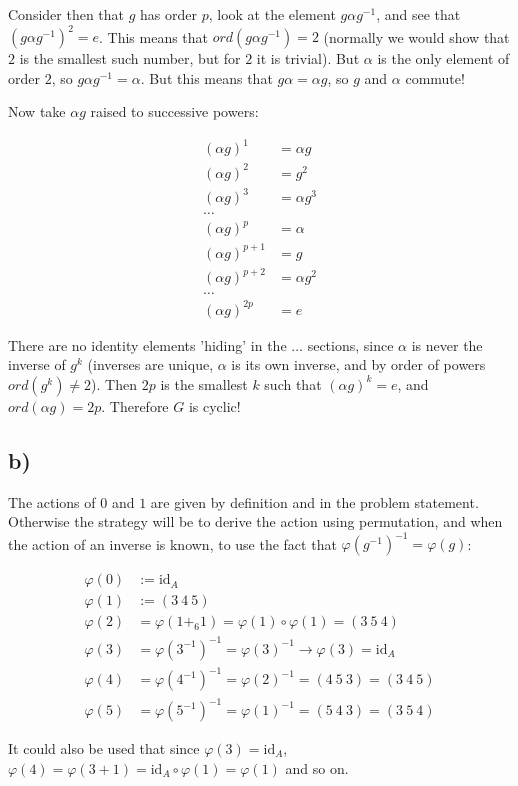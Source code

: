 \documentclass[a4paper,12pt]{article}
\begin{document}
Consider then that $g$ has order $p$, look at the element $g \alpha g^{-1}$, and see that $(g \alpha g^{-1})^2 = e$. This means that $ord(g \alpha g^{-1}) = 2$ (normally we would show that $2$ is the smallest such number, but for $2$ it is trivial). But $\alpha$ is the only element of order $2$, so $g \alpha g^{-1} = \alpha$. But this means that $g \alpha = \alpha g$, so $g$ and $\alpha$ commute!

Now take $\alpha g$ raised to successive powers:

\begin{align*}
    (\alpha g)^1 &= \alpha g \\
    (\alpha g)^2 &= g^2 \\
    (\alpha g)^3 &= \alpha g^3 \\
    \dots \\
    (\alpha g)^p &= \alpha \\
    (\alpha g)^{p + 1} &= g \\
    (\alpha g)^{p + 2} &= \alpha g^2 \\
    \dots \\
    (\alpha g)^{2p} &= e
\end{align*}

There are no identity elements 'hiding' in the $\dots$ sections, since $\alpha$ is never the inverse of $g^k$ (inverses are unique, $\alpha$ is its own inverse, and by order of powers $ord(g^k) \neq 2$). Then $2p$ is the smallest $k$ such that $(\alpha g)^k = e$, and $ord(\alpha g) = 2p$. Therefore $G$ is cyclic!

\newpage
\subsection*{b)}

The actions of $0$ and $1$ are given by definition and in the problem statement. Otherwise the strategy will be to derive the action using permutation, and when the action of an inverse is known, to use the fact that $\varphi(g^{-1})^{-1} = \varphi(g)$:

\begin{align*}
\varphi(0) &:= \mathrm{id}_A \\
\varphi(1) &:= (3\ 4\ 5) \\
\varphi(2) &= \varphi(1+_6 1) = \varphi(1) \circ \varphi(1) = (3\ 5\ 4) \\
\varphi(3) &= \varphi(3^{-1})^{-1} = \varphi(3)^{-1} \rightarrow \varphi(3) = \mathrm{id}_A \\
\varphi(4) &= \varphi(4^{-1})^{-1} = \varphi(2)^{-1} = (4\ 5\ 3) = (3\ 4\ 5) \\
\varphi(5) &= \varphi(5^{-1})^{-1} = \varphi(1)^{-1} = (5\ 4\ 3) = (3\ 5\ 4)
\end{align*}

It could also be used that since $\varphi(3) = \mathrm{id}_A$, $\varphi(4) = \varphi(3 + 1) = \mathrm{id}_A \circ \varphi(1) = \varphi(1)$ and so on. 
\end{document}
